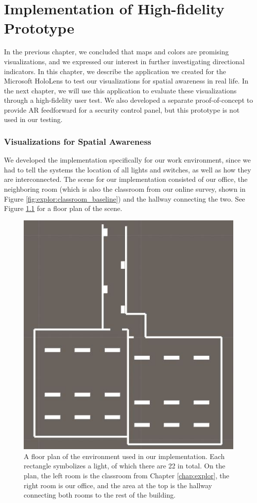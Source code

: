 \chapter{Implementation of High-fidelity Prototype} \label{chap:impl}
In the previous chapter, we concluded that maps and colors are promising visualizations, and we expressed our interest in further investigating directional indicators. In this chapter, we describe the application we created for the Microsoft HoloLens to test our visualizations for spatial awareness in real life. In the next chapter, we will use this application to evaluate these visualizations through a high-fidelity user test. We also developed a separate proof-of-concept to provide AR feedforward for a security control panel, but this prototype is not used in our testing.

\subsection{Visualizations for Spatial Awareness}
We developed the implementation specifically for our work environment, since we had to tell the systems the location of all lights and switches, as well as how they are interconnected. The scene for our implementation consisted of our office, the neighboring room (which is also the classroom from our online survey, shown in Figure \ref{fig:explor:classroom_baseline}) and the hallway connecting the two. See Figure \ref{fig:scene} for a floor plan of the scene.

\begin{figure}
    \centering
    \includegraphics[width=0.8\linewidth]{resources/implementation/scene.jpg}
    \caption{A floor plan of the environment used in our implementation. Each rectangle symbolizes a light, of which there are 22 in total. On the plan, the left room is the classroom from Chapter \ref{chap:explor}, the right room is our office, and the area at the top is the hallway connecting both rooms to the rest of the building.}
    \label{fig:scene}
\end{figure}

